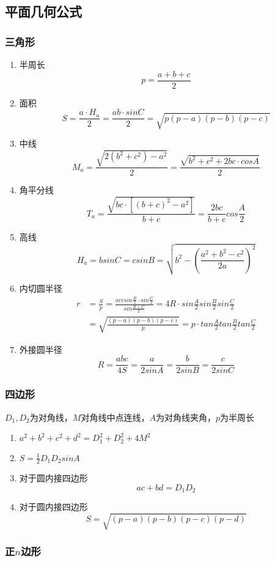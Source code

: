 \documentclass[a4paper]{article}
\begin{document}
\subsection{平面几何公式}

\subsubsection{三角形}

\begin{enumerate}
	\item 半周长
	$$p=\frac{a+b+c}{2}$$
	\item 面积
	$$S=\frac{a \cdot H_a}{2}=\frac{ab \cdot sinC}{2}=\sqrt{p(p-a)(p-b)(p-c)}$$
	\item 中线
	$$M_a=\frac{\sqrt{2(b^2+c^2)-a^2}}{2}=\frac{\sqrt{b^2+c^2+2bc \cdot cosA}}{2}$$
	\item 角平分线 
	$$T_a=\frac{\sqrt{bc \cdot [(b+c)^2-a^2]}}{b+c}=\frac{2bc}{b+c}cos\frac{A}{2}$$
	\item 高线
	$$H_a=bsinC=csinB=\sqrt{b^2-(\frac{a^2+b^2-c^2}{2a})^2}$$
	\item 内切圆半径
	\begin{align*}
	r&=\frac{S}{p}=\frac{arcsin\frac{B}{2} \cdot sin\frac{C}{2}}{sin\frac{B+C}{2}}=4R \cdot sin\frac{A}{2}sin\frac{B}{2}sin\frac{C}{2}\\
	&=\sqrt{\frac{(p-a)(p-b)(p-c)}{p}}=p \cdot tan\frac{A}{2}tan\frac{B}{2}tan\frac{C}{2}
	\end{align*}
	\item 外接圆半径
	$$R=\frac{abc}{4S}=\frac{a}{2sinA}=\frac{b}{2sinB}=\frac{c}{2sinC}$$
\end{enumerate}

\subsubsection{四边形}

$D_1, D_2$为对角线，$M$对角线中点连线，$A$为对角线夹角，$p$为半周长
\begin{enumerate}
	\item $a^2+b^2+c^2+d^2=D_1^2+D_2^2+4M^2$
	\item $S=\frac{1}{2}D_1D_2sinA$
	\item 对于圆内接四边形
	$$ac+bd=D_1D_2$$
	\item 对于圆内接四边形
	$$S=\sqrt{(p-a)(p-b)(p-c)(p-d)}$$
\end{enumerate}

\subsubsection{正$n$边形}
\end{document}
